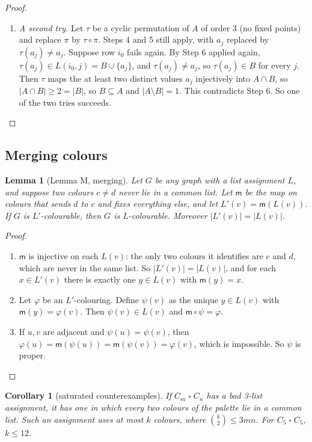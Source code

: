 \documentclass[11pt]{article}
\theoremstyle{plain}
\newtheorem{lemma}[theorem]{Lemma}
\newtheorem{corollary}[theorem]{Corollary}
\theoremstyle{definition}
\theoremstyle{remark}
\newcommand{\T}{\mathbin{\square}}
\newcommand{\sm}{\setminus}
\newenvironment{steps}[1][]{\begin{enumerate}[label=\textbf{Step \arabic*.},leftmargin=4.4em,itemsep=0.35em,#1]}{\end{enumerate}}
\begin{document}
\begin{proof}
\begin{steps}
least two distinct values, all in $A \sm B$. Hence $|A \sm B| \ge 2$.
\item \emph{A second try.} Let $\tau$ be a cyclic permutation of $A$ of order 3 (no fixed points) and replace $\pi$ by
$\tau \circ \pi$. Steps 4 and 5 still apply, with $a_j$ replaced by $\tau(a_j) \ne a_j$. Suppose row $i_0$ fails again.
By Step 6 applied again, $\tau(a_j) \in L(i_0, j) = B \cup \{a_j\}$, and $\tau(a_j) \ne a_j$, so $\tau(a_j) \in B$ for every
$j$. Then $\tau$ maps the at least two distinct values $a_j$ injectively into $A \cap B$, so $|A \cap B| \ge 2 = |B|$,
so $B \subseteq A$ and $|A \sm B| = 1$. This contradicts Step 6. So one of the two tries succeeds. \qedhere
\end{steps}
\end{proof}

\subsection{Merging colours}

\begin{lemma}[Lemma M, merging]\label{merge}
Let $G$ be any graph with a list assignment $L$, and suppose two colours $c \ne d$ never lie in a common list. Let
$\mathsf{m}$ be the map on colours that sends $d$ to $c$ and fixes everything else, and let $L'(v) = \mathsf{m}(L(v))$.
If $G$ is $L'$-colourable, then $G$ is $L$-colourable. Moreover $|L'(v)| = |L(v)|$.
\end{lemma}

\begin{proof}
\begin{steps}
\item $\mathsf{m}$ is injective on each $L(v)$: the only two colours it identifies are $c$ and $d$, which are never in
the same list. So $|L'(v)| = |L(v)|$, and for each $x \in L'(v)$ there is exactly one $y \in L(v)$ with
$\mathsf{m}(y) = x$.
\item Let $\varphi$ be an $L'$-colouring. Define $\psi(v)$ as the unique $y \in L(v)$ with $\mathsf{m}(y) = \varphi(v)$. Then
$\psi(v) \in L(v)$ and $\mathsf{m} \circ \psi = \varphi$.
\item If $u, v$ are adjacent and $\psi(u) = \psi(v)$, then $\varphi(u) = \mathsf{m}(\psi(u)) = \mathsf{m}(\psi(v)) = \varphi(v)$,
which is impossible. So $\psi$ is proper. \qedhere
\end{steps}
\end{proof}

\begin{corollary}[saturated counterexamples]\label{saturated}
If $C_m \T C_n$ has a bad 3-list assignment, it has one in which every two colours of the palette lie in a common
list. Such an assignment uses at most $k$ colours, where $\binom{k}{2} \le 3mn$. For $C_5 \T C_5$, $k \le 12$.
\end{corollary}
\end{document}

